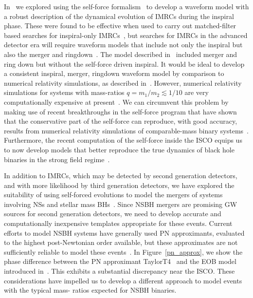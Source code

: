 In~\cite{Huerta:2009,Huerta:2010,Huerta:EHE,Huerta:2012} we explored using the self-force formalism~\cite{SFB,LRP} to develop a waveform model with a robust description of the dynamical evolution of IMRCs during the inspiral phase. These were found to be effective when used to carry out matched-filter based searches for inspiral-only IMRCs~\cite{Smith:2013}, but searches for IMRCs in the advanced detector era will require waveform models that include not only the inspiral but also the merger and ringdown~\cite{Smith:2013}. The model described in~\cite{Huerta:2011a} included merger and ring down but without the self-force driven inspiral. It would be ideal to develop a consistent inspiral, merger, ringdown waveform model by comparison to numerical relativity simulations, as described in~\cite{BuonannoEOBv2Main,Damour:2013}. However, numerical relativity simulations for systems with mass-ratios \(q=m_1/m_2 \lesssim 1/10\) are very computationally expensive at present~\cite{Mroue:2013xna}. We can circumvent this problem by 
making use of recent breakthroughs in the self-force program that have shown that the conservative part of the self-force can reproduce, with good accuracy, results from numerical relativity simulations of comparable-mass binary systems~\cite{LeTiec:2012}.   Furthermore, the recent computation of the self-force inside the ISCO equips us to now develop models that better reproduce the true dynamics of black hole binaries in the strong field regime~\cite{Akcay:2012}.  

In addition to IMRCs, which may be detected by second generation detectors, and with more likelihood by third generation detectors, we have explored the suitability of using self-forced evolutions to model the mergers of systems involving NSs and stellar mass BHs~\cite{LVCT}. Since NSBH mergers are promising GW sources for second generation detectors, we need to develop accurate and computationally inexpensive templates appropriate for these events. Current efforts to model NSBH systems have generally used PN approximants, evaluated to the highest post-Newtonian order available, but these approximates are not sufficiently reliable to model these events~\cite{pnbuo,Nitz:2013mxa}. In Figure~\ref{pn_approx}, we show the phase difference between the PN approximant TaylorT4~\cite{TaylorT4Origin} and the EOB model introduced in~\cite{BuonannoEOBv2Main, Damour:2013}. This exhibits a substantial discrepancy near the ISCO. These considerations have impelled us to develop a different approach to model events with the typical mass-
ratios expected for NSBH binaries. 



